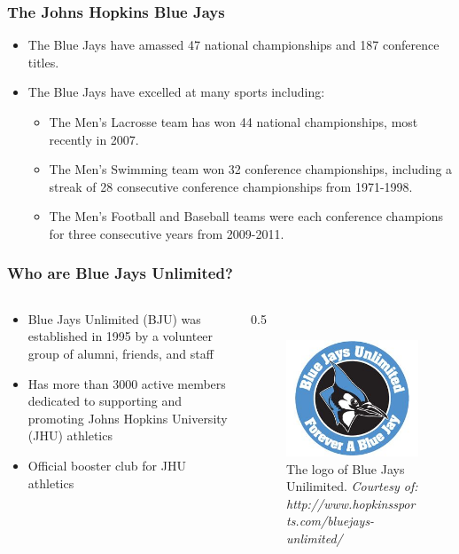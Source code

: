 \documentclass[compress,handout,10pt]{beamer}
\let\olditem\item
\renewcommand{\item}{\setlength{\itemsep}{0.5\baselineskip}\olditem}
\begin{document}
\begin{frame}
	\frametitle{The Johns Hopkins Blue Jays}
		\begin{itemize}
			\item The Blue Jays have amassed 47 national championships and 187 conference titles.\cite{hopathletic}
			\item The Blue Jays have excelled at many sports including:
			\begin{itemize}
				\item The Men's Lacrosse team has won 44 national championships, most recently in 2007.\cite{hopathletic}
				\item The Men's Swimming team won 32 conference championships, including a streak of 28 consecutive conference championships from 1971-1998.\cite{hopathletic}
				\item The Men's Football and Baseball teams were each conference champions for three consecutive years from 2009-2011. \cite{hopathletic}
		\end{itemize}
	\end{itemize}
\end{frame}

\begin{frame}
	\frametitle{Who are Blue Jays Unlimited?}
		\begin {columns}
			\begin{column}{0.5\textwidth}
				\begin {itemize}
					\item Blue Jays Unlimited (BJU) was established in 1995 \cite{bjuwebsite} by a volunteer group of alumni, friends, and staff
					\item Has more than 3000 active members dedicated to supporting and promoting Johns Hopkins University (JHU) athletics \cite{bjuwebsite}
					\item Official booster club for JHU athletics \cite{bjuwebsite}
				\end {itemize}
			\end {column}
			\begin {column}{0.5\textwidth}
				\begin{figure} [h]
					\begin{center}
						\includegraphics [width=2in] {BJU.jpg}
						\caption {{\tiny The logo of Blue Jays Unilimited. \textit{Courtesy of: http://www.hopkinssports.com/bluejays-unlimited/}}}
					\end{center}
				\end {figure}
			\end {column}
		\end{columns}
\end{frame}
\end{document}
